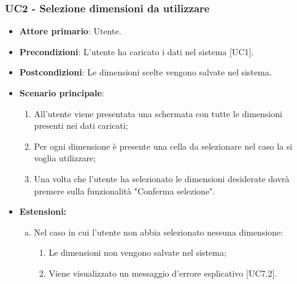 \subsubsection{UC2 - Selezione dimensioni da utilizzare}
\begin{itemize}
	\item \textbf{Attore primario}: Utente.
	\item \textbf{Precondizioni}: L'utente ha caricato i dati nel sistema [UC1].
	\item \textbf{Postcondizioni}: Le dimensioni scelte vengono salvate nel sistema.
	\item \textbf{Scenario principale}:
		\begin{enumerate}
			\item All'utente viene presentata una schermata con tutte le dimensioni presenti nei dati caricati;
			\item Per ogni dimensione è presente una cella da selezionare nel caso la si voglia utilizzare;
			\item Una volta che l'utente ha selezionato le dimensioni desiderate dovrà premere sulla funzionalità "Conferma selezione".
		\end{enumerate}
	\item \textbf{Estensioni:}
		\begin{enumerate}[(a)]
			\item Nel caso in cui l'utente non abbia selezionato nessuna dimensione:
			\begin{enumerate}[1.]
				\item Le dimensioni non vengono salvate nel sistema;
				\item Viene visualizzato un messaggio d'errore esplicativo [UC7.2].
			\end{enumerate}
		\end{enumerate}
\end{itemize}